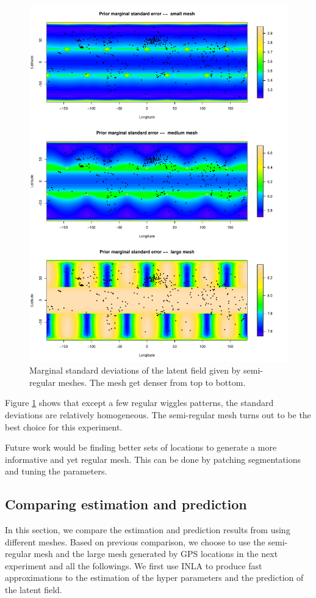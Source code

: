 \documentclass[a4paper,12pt]{article}
\begin{document}
\begin{figure}[htbp]
 \begin{center}
 \includegraphics[scale=0.8]{fig/prior_Globemesh.pdf}
 \end{center}
 \caption[Semi-regular mesh]{Marginal standard deviations of the latent field given by semi-regular meshes. The mesh get denser from top to bottom.}
 \label{fig:reg_mesh}
 \end{figure}
Figure \ref{fig:reg_mesh} shows that except a few regular wiggles patterns, the standard deviations are relatively homogeneous. The semi-regular mesh turns out to be the best choice for this experiment.

Future work would be finding better sets of locations to generate a more informative and yet regular mesh. This can be done by patching segmentations and tuning the parameters.
 
\subsection{Comparing estimation and prediction}
In this section, we compare the estimation and prediction results from using different meshes. Based on previous comparison, we choose to use the semi-regular mesh and the large mesh generated by GPS locations in the next experiment and all the followings. We first use INLA to produce fast approximations to the estimation of the hyper parameters and the prediction of the latent field.
\end{document}
